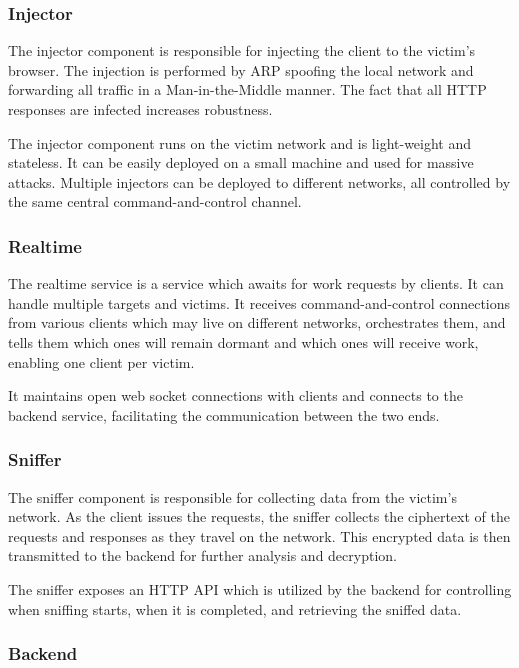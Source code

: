 \documentclass[conference, letterpaper, 10pt]{IEEEtran}
\begin{document}
\subsubsection{Injector}

The injector component is responsible for injecting the client to the victim's
browser. The injection is performed by ARP spoofing the local
network and forwarding all traffic in a Man-in-the-Middle manner. The fact that all HTTP
responses are infected increases robustness.

The injector component runs on the victim network and is
light-weight and stateless. It can be easily deployed on a small machine and
used for massive attacks. Multiple injectors can be deployed to different
networks, all controlled by the same central command-and-control channel.

\subsubsection{Realtime}

The realtime service is a service which awaits for work requests by clients. It
can handle multiple targets and victims. It receives command-and-control
connections from various clients which may live on different networks,
orchestrates them, and tells them which ones will remain dormant and which ones
will receive work, enabling one client per victim.

It maintains open web socket connections with clients and
connects to the backend service, facilitating the communication between the two
ends.

\subsubsection{Sniffer}

The sniffer component is responsible for collecting data from the
victim's network. As the client issues the requests, the sniffer
collects the ciphertext of the requests and responses as they
travel on the network. This encrypted data is then transmitted to the backend
for further analysis and decryption.

The sniffer exposes an HTTP API which is utilized by the backend for controlling
when sniffing starts, when it is completed, and retrieving the sniffed data.

\subsubsection{Backend}
\end{document}
